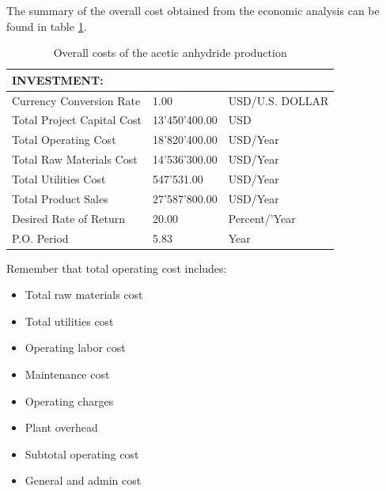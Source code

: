 \begin{enumerate}[label=\textbf{Step \arabic{enumi}}:,ref=Step \arabic{enumi}]
	The summary of the overall cost obtained from the economic analysis can be found in table \ref{tab:AceticProdInvestment}.
	
	\begin{table}[H]
		\centering
		\begin{tabular}{l|ll}
			INVESTMENT:                &  \\ \hline
			Currency Conversion Rate   & 1.00                                               & USD/U.S. DOLLAR                                        \\
			Total Project Capital Cost & 13'450'400.00                                        & USD                                                    \\
			Total Operating Cost       & 18'820'400.00                                        & USD/Year                                               \\
			Total Raw Materials Cost   & 14'536'300.00                                        & USD/Year                                               \\
			Total Utilities Cost       & 547'531.00                                          & USD/Year                                               \\
			Total Product Sales        & 27'587'800.00                                        & USD/Year                                               \\
			Desired Rate of Return     & 20.00                                              & Percent/'Year                                          \\
			P.O. Period                & 5.83                                               & Year            \\ \hline                                      
		\end{tabular}
	\caption{Overall costs of the acetic anhydride production}
	\label{tab:AceticProdInvestment}
	\end{table}

	Remember that total operating cost includes:
	
	\begin{multicols}{2}
		\begin{itemize}
			\item Total raw materials cost
			\item Total utilities cost
			\item Operating labor cost
			\item Maintenance cost
			\item Operating charges
			\item Plant overhead
			\item Subtotal operating cost
			\item General and admin cost
		\end{itemize} 
	\end{multicols}
	
	\end{enumerate}
	

